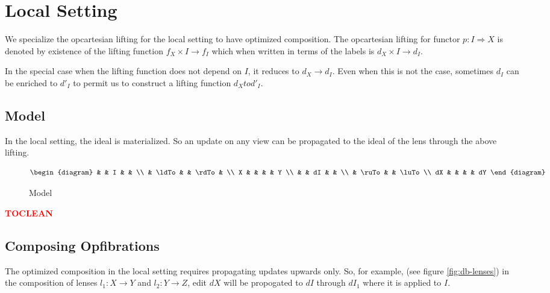 \documentclass[a4paper,10pt]{article}
\newcommand{\finish}[1]{#1}
\newcommand{\comment}[1]{\finish{\textbf{\textcolor{red}{#1}}}}
\begin{document}
\section{Local Setting}
We specialize the opcartesian lifting for the local setting to have
optimized composition. The opcartesian lifting for functor $p: I
\Rightarrow X$ is denoted by existence of the lifting function $f_X
\times I \to f_I$ which when written in terms of the labels is $d_X
\times I \to d_I$. 

In the special case when the lifting function does not depend on $I$,
it reduces to $d_X \to d_I$. Even when this is not the case, 
sometimes $d_I$ can be enriched to $d'_I$ to permit us to construct
a lifting function $d_X to d'_I$.

\subsection{Model}
In the local setting, the ideal is materialized. So an update on any
view can be propagated to the ideal of the lens through the above
lifting.

\begin{figure}[ht]
\begin{displaymath}
\begin{diagram}
  &       & I &   &  \\
  & \ldTo & & \rdTo & \\
X & & & & Y      \\
  &       & dI  & & \\
  & \ruTo & & \luTo \\
dX & & & & dY
\end{diagram}
\end{displaymath}
\caption{Model}
\label{fig:db-lens}
\end{figure}  

\comment{TOCLEAN}
\subsection{Composing Opfibrations}
The optimized composition in the local setting requires
propagating updates upwards only. So, for example, (see figure
\ref{fig:db-lenses}) in the composition of lenses $l_1: X \to Y$ and
$l_2: Y \to Z$, edit $dX$ will be propogated to $dI$ through $dI_1$
where it is applied to $I$. 
\end{document}

